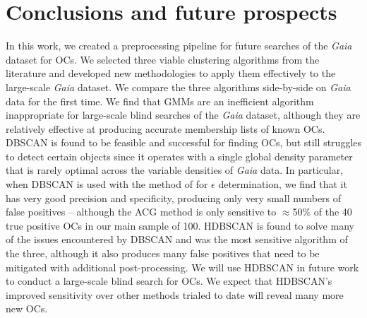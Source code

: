 


\section{Conclusions and future prospects}\label{c2:sec:conclusion}

In this work, we created a preprocessing pipeline for future searches of the \emph{Gaia} dataset for OCs. We selected three viable clustering algorithms from the literature and developed new methodologies to apply them effectively to the large-scale \emph{Gaia} dataset. We compare the three algorithms side-by-side on \emph{Gaia} data for the first time. We find that GMMs are an inefficient algorithm inappropriate for large-scale blind searches of the \emph{Gaia} dataset, although they are relatively effective at producing accurate membership lists of known OCs. DBSCAN is found to be feasible and successful for finding OCs, but still struggles to detect certain objects since it operates with a single global density parameter that is rarely optimal across the variable densities of \emph{Gaia} data. In particular, when DBSCAN is used with the method of \cite{castro-ginard_new_2018} for $\epsilon$ determination, we find that it has very good precision and specificity, producing only very small numbers of false positives -- although the ACG method is only sensitive to $\approx$50\% of the 40 true positive OCs in our main sample of 100. HDBSCAN is found to solve many of the issues encountered by DBSCAN and was the most sensitive algorithm of the three, although it also produces many false positives that need to be mitigated with additional post-processing. We will use HDBSCAN in future work to conduct a large-scale blind search for OCs. We expect that HDBSCAN's improved sensitivity over other methods trialed to date will reveal many more new OCs.

